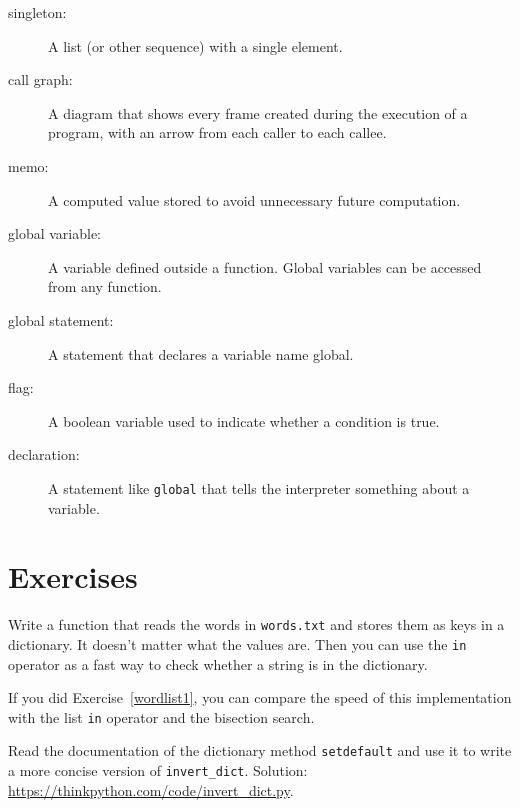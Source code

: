 \documentclass[10pt]{book}
\begin{document}
\begin{description}
\item[singleton:] A list (or other sequence) with a single element.

\item[call graph:] A diagram that shows every frame created during
the execution of a program, with an arrow from each caller to
each callee.

\item[memo:] A computed value stored to avoid unnecessary future
computation.

\item[global variable:]  A variable defined outside a function.  Global
variables can be accessed from any function.

\item[global statement:]  A statement that declares a variable name
global.

\item[flag:] A boolean variable used to indicate whether a condition
is true.

\item[declaration:] A statement like {\tt global} that tells the
interpreter something about a variable.

\end{description}


\section{Exercises}

\begin{exercise}
\label{wordlist2}

Write a function that reads the words in {\tt words.txt} and
stores them as keys in a dictionary.  It doesn't matter what the
values are.  Then you can use the {\tt in} operator
as a fast way to check whether a string is in
the dictionary.

If you did Exercise~\ref{wordlist1}, you can compare the speed
of this implementation with the list {\tt in} operator and the
bisection search.

\end{exercise}


\begin{exercise}
\label{setdefault}

Read the documentation of the dictionary method {\tt setdefault}
and use it to write a more concise version of \verb"invert_dict".
Solution: \url{https://thinkpython.com/code/invert_dict.py}.

\end{exercise}
\end{document}
